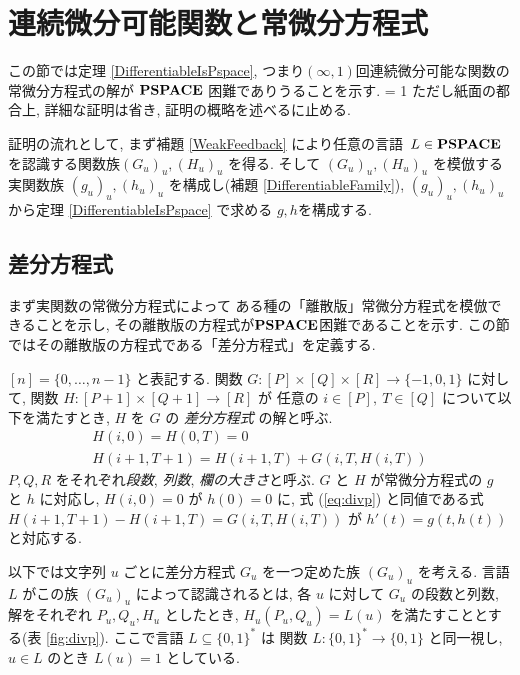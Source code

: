 \section{連続微分可能関数と常微分方程式}
\label{section:differentiable}

この節では定理 \ref{DifferentiableIsPspace},
つまり$(\infty, 1)$回連続微分可能な関数の常微分方程式の解が
$\mathbf{PSPACE}$ 困難でありうることを示す.
\ifnum \proc = 1
ただし紙面の都合上, 詳細な証明は省き, 証明の概略を述べるに止める.
\fi

証明の流れとして, まず補題 \ref{WeakFeedback} により任意の言語\ 
$L \in \mathbf{PSPACE}$ を認識する関数族$(G_u)_u, (H_u)_u$ を得る.
そして $(G_u)_u, (H_u)_u$ を模倣する
実関数族 $(g_u)_u, (h_u)_u$ を構成し(補題 \ref{DifferentiableFamily}),
$(g_u)_u, (h_u)_u$ から定理 \ref{DifferentiableIsPspace} で求める $g, h$を構成する.


\subsection{差分方程式}
\label{section:divp}

まず実関数の常微分方程式によって
ある種の「離散版」常微分方程式を模倣できることを示し, 
その離散版の方程式が$\mathbf{PSPACE}$困難であることを示す.
この節ではその離散版の方程式である「差分方程式」を定義する.

$[n] = \{0, \dots , n-1\}$ と表記する.
関数 $G \colon [P] \times [Q] \times [R] \to \{-1, 0, 1\}$ に対して,
関数 $H \colon [P + 1] \times [Q+1] \to [R]$ が
任意の $i \in [P],\ T \in [Q]$ について以下を満たすとき,
$H$ を $G$ の \emph{差分方程式} の解と呼ぶ.
\begin{gather}
   H(i, 0) = H(0, T) = 0 
\\
   H(i + 1, T + 1) = H(i+1, T) + G(i, T, H(i, T))  \label{eq:divp}
\end{gather}
$P, Q, R$ をそれぞれ\emph{段数}, \emph{列数}, \emph{欄の大きさ}と呼ぶ.
$G$ と $H$ が常微分方程式の $g$ と $h$ に対応し,
$H(i, 0) = 0$ が $h(0) = 0$ に,
式 (\ref{eq:divp}) と同値である式 $H(i + 1, T + 1) - H(i+1, T) = G(i, T, H(i, T))$
が $h'(t) = g(t, h(t))$ と対応する.

以下では文字列 $u$ ごとに差分方程式 $G _u$ を一つ定めた族 $(G _u) _u$ を考える. 
言語 $L$ がこの族 $(G_u)_u$ によって認識されるとは,
各 $u$ に対して $G_u$ の段数と列数, 解をそれぞれ $P_u, Q_u, H_u$ としたとき,
$H_u(P_u, Q_u) = L(u)$ を満たすこととする(表 \ref{fig:divp}).
ここで言語 $L \subseteq \{0, 1\} ^*$ は
関数 $L \colon \{0, 1\} ^* \to \{0, 1\}$ と同一視し, 
$u \in L$ のとき $L (u) = 1$ としている. 


